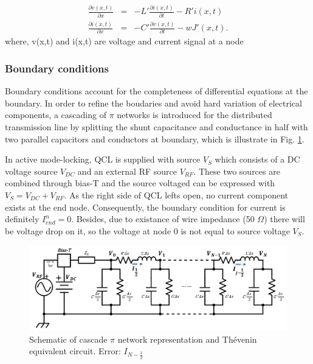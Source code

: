 \documentclass[11pt,final]{scrbook}
\begin{document}
\begin{eqnarray}
\frac { \partial v(x,t) }{ \partial x }  &=& -L'\frac { \partial i(x,t) }{ \partial t }-R'i(x,t) \label{eq:TLequation5}\\
\frac { \partial i(x,t) }{ \partial x }  &=& - C'\frac { \partial v(x,t) }{ \partial t }-wJ'(x,t). \label{eq:TLequation6}
\end{eqnarray}
where, v(x,t) and i(x,t) are voltage and current signal at a node
\subsubsection{Boundary conditions}
Boundary conditions account for the completeness of differential equations at the boundary. In order to refine the boudaries and avoid hard variation of electrical components, a cascading of $\pi$ networks\cite{orlandi1996fdtd} is introduced for the distributed transmission line by splitting the shunt capacitance and conductance in half with two parallel capacitors and conductors at boundary, which is illustrate in Fig. \ref{fig:BoundaryCondition}. 

In active mode-locking, QCL is supplied with source $ {V}_{S} $ which consists of a DC voltage source $ {V}_{DC} $ and an external RF source $ {V}_{RF} $. These two sources are combined through bias-T and the source voltaged can be expressed with $ {V}_{S}=V_{DC}+{V}_{RF} $. As the right side of QCL lefts open, no current component exists at the end node. Consequently, the boundary condition for current is definitely ${I}_{end}^{n} = 0$. Besides, due to existance of wire impedance (50 $\Omega$) there will be voltage drop on it, so the voltage at node 0 is not equal to source voltage $ {V}_{S} $.
\begin{figure}[htbp]
\begin{center}
\includegraphics[scale=0.55]{images/pi_representation}
\caption{Schematic of cascade $\pi$ network representation and Thévenin equivalent circuit. Error: $I_{N-\frac{1}{2}}$}
\label{fig:BoundaryCondition}
\end{center}
\end{figure}
\end{document}
